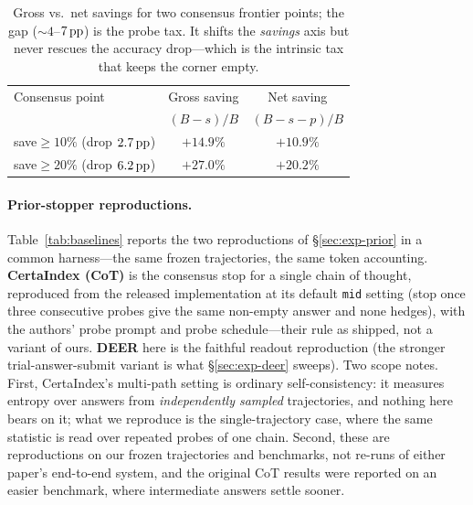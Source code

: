 \begin{table}[t]
  \centering\small
  \begin{tabular}{lcc}
    \toprule
    Consensus point & Gross saving & Net saving \\
                    & $(B-s)/B$    & $(B-s-p)/B$ \\
    \midrule
    save$\ge10\%$ (drop $2.7\,\text{pp}$) & $+14.9\%$ & $+10.9\%$ \\
    save$\ge20\%$ (drop $6.2\,\text{pp}$) & $+27.0\%$ & $+20.2\%$ \\
    \bottomrule
  \end{tabular}
  \caption{Gross vs.\ net savings for two consensus frontier points; the gap
  ($\sim\!4$--$7\,\text{pp}$) is the probe tax. It shifts the \emph{savings} axis but
  never rescues the accuracy drop---which is the intrinsic tax that keeps the
  corner empty.}
  \label{tab:grossnet}
\end{table}

\paragraph{Prior-stopper reproductions.}
Table~\ref{tab:baselines} reports the two reproductions of
\S\ref{sec:exp-prior} in a common harness---the same frozen trajectories, the
same token accounting. \textbf{CertaIndex (CoT)} \citep{dynasor_certaindex} is
the consensus stop for a single chain of thought, reproduced from the released
implementation at its default \texttt{mid} setting (stop once three consecutive
probes give the same non-empty answer and none hedges), with the authors' probe
prompt and probe schedule---their rule as shipped, not a variant of ours.
\textbf{DEER} \citep{deer} here is the faithful readout reproduction (the
stronger trial-answer-submit variant is what \S\ref{sec:exp-deer} sweeps). Two
scope notes. First, CertaIndex's multi-path setting is ordinary
self-consistency: it measures entropy over answers from \emph{independently
sampled} trajectories, and nothing here bears on it; what we reproduce is the
single-trajectory case, where the same statistic is read over repeated probes
of one chain. Second, these are reproductions on our frozen trajectories and
benchmarks, not re-runs of either paper's end-to-end system, and the original
CoT results were reported on an easier benchmark, where intermediate answers
settle sooner.

